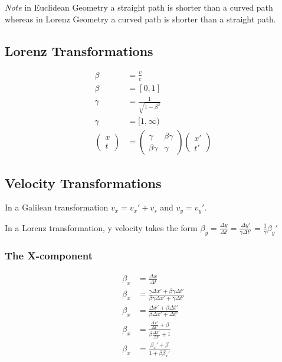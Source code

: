 \documentclass[12pt,letterpaper, twocolumn]{article}
\begin{document}
\textit{Note} in Euclidean Geometry a straight path is shorter than a curved path whereas in Lorenz Geometry a curved path is shorter than a straight path.

\subsection{Lorenz Transformations}
\begin{align*}
    \beta &= \frac{v}{c}\\
    \beta &= [0,1]\\
    \gamma &= \frac{1}{\sqrt{1-\beta^2}}\\
    \gamma &= [1,\infty)\\
    \begin{pmatrix}
    x\\t
    \end{pmatrix} &= \begin{pmatrix}\gamma & \beta \gamma \\ \beta \gamma & \gamma\end{pmatrix}\begin{pmatrix}x'\\t'\end{pmatrix}
\end{align*}

\subsection{Velocity Transformations}
In a Galilean transformation $v_x=v_x'+v_s$ and $v_y=v_y'$. 

In a Lorenz transformation, y velocity takes the form $\beta_y=\frac{\Delta y}{\Delta t} = \frac{\Delta y'}{\gamma \Delta t'} = \frac{1}{\gamma}\beta_y'$

\subsubsection*{The X-component}
\begin{align*}
    \beta_x &= \frac{\Delta x}{\Delta t}\\
    \beta_x &= \frac{\gamma \Delta x' + \beta \gamma \Delta t'}{ \beta \gamma \Delta x' + \gamma \Delta t'}\\
    \beta_x &= \frac{ \Delta x' + \beta  \Delta t'}{ \beta  \Delta x' +  \Delta t'}\\
    \beta_x &= \frac{\frac{\Delta x'}{\Delta t'} + \beta}{ \beta  \frac{\Delta x'}{\Delta t'} +  1}\\
    \beta_x &= \frac{\beta_x' + \beta}{1+\beta\beta_x'}
\end{align*}
\end{document}
